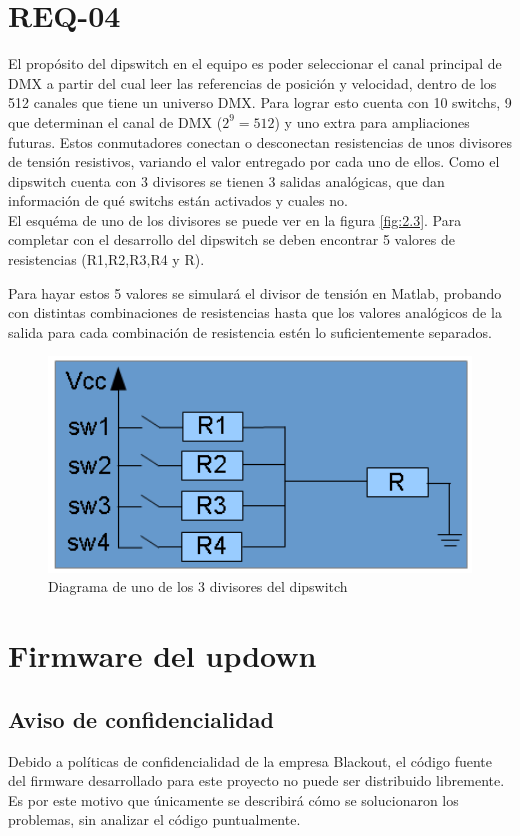 \section{REQ-04} \label{sec:\thesection}
El propósito del dipswitch en el equipo es poder seleccionar el canal principal de DMX a partir del cual leer las referencias de posición y velocidad, dentro de los 512 canales que tiene un universo DMX. Para lograr esto cuenta con 10 switchs, 9 que determinan el canal de DMX (\( 2^9 = 512 \)) y uno extra para ampliaciones futuras. Estos conmutadores conectan o desconectan resistencias de unos divisores de tensión resistivos, variando el valor entregado por cada uno de ellos. Como el dipswitch cuenta con 3 divisores se tienen 3 salidas analógicas, que dan información de qué switchs están activados y cuales no. \\
El esquéma de uno de los divisores se puede ver en la figura \ref{fig:2.3}. Para completar con el desarrollo del dipswitch se deben encontrar 5 valores de resistencias (R1,R2,R3,R4 y R).

Para hayar estos 5 valores se simulará el divisor de tensión en Matlab, probando con distintas combinaciones de resistencias hasta que los valores analógicos de la salida para cada combinación de resistencia estén lo suficientemente separados.

\begin{figure}[!ht]
	\centering
	\includegraphics[width=12cm,scale=1]{resources/2_3-dipswitch.png}
	\caption{Diagrama de uno de los 3 divisores del dipswitch}
	\label{fig:\thefigure}
\end{figure}

\section{Firmware del updown} \label{sec:\thesection}
\subsection{Aviso de confidencialidad}
Debido a políticas de confidencialidad de la empresa Blackout, el código fuente del firmware desarrollado para este proyecto no puede ser distribuido libremente. Es por este motivo que únicamente se describirá cómo se solucionaron los problemas, sin analizar el código puntualmente.

